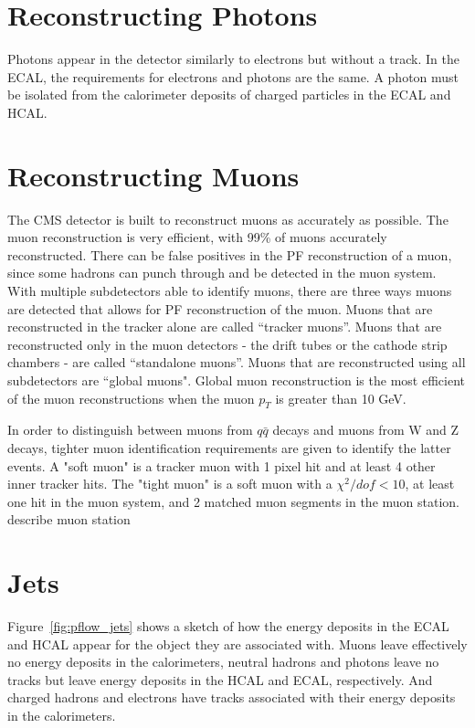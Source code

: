 \section{Reconstructing Photons}

Photons appear in the detector similarly to electrons but without a track. In the ECAL, the requirements for electrons and photons are the same. A photon must be isolated from the calorimeter deposits of charged particles in the ECAL and HCAL.

\section{Reconstructing Muons}

The CMS detector is built to reconstruct muons as accurately as possible. The muon reconstruction is very efficient, with 99\% of muons accurately reconstructed. There can be false positives in the PF reconstruction of a muon, since some hadrons can punch through and be detected in the muon system. With multiple subdetectors able to identify muons, there are three ways muons are detected that allows for PF reconstruction of the muon. Muons that are reconstructed in the tracker alone are called “tracker muons”. Muons that are reconstructed only in the muon detectors - the drift tubes or the cathode strip chambers - are called “standalone muons”. Muons that are reconstructed using all subdetectors are “global muons". Global muon reconstruction is the most efficient of the muon reconstructions when the muon $p_T$ is greater than 10 GeV.

In order to distinguish between muons from $q\bar{q}$ decays and muons from W and Z decays, tighter muon identification requirements are given to identify the latter events. A "soft muon" is a tracker muon with 1 pixel hit and at least 4 other inner tracker hits. The "tight muon" is a soft muon with a $\chi^2/dof < 10$, at least one hit in the muon system, and 2 matched muon segments in the muon station. {\color{red} describe muon station}


\section{Jets}

Figure~\ref{fig:pflow_jets} shows a sketch of how the energy deposits in the ECAL and HCAL appear for the object they are associated with. Muons leave effectively no energy deposits in the calorimeters, neutral hadrons and photons leave no tracks but leave energy deposits in the HCAL and ECAL, respectively. And charged hadrons and electrons have tracks associated with their energy deposits in the calorimeters.


